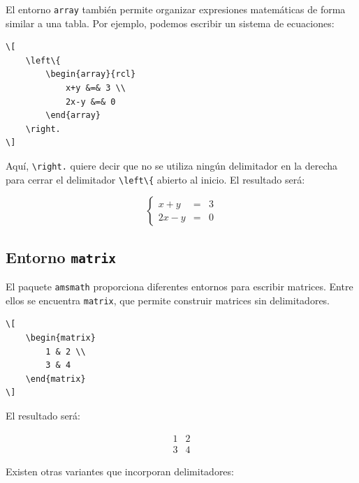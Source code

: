 \documentclass[11pt,a4paper]{article}
\theoremstyle{plain}
\theoremstyle{definition}
\theoremstyle{remark}
\theoremstyle{exercise}
\begin{document}
\noindent El entorno \verb|array| también permite organizar expresiones matemáticas de forma similar a una tabla. Por ejemplo, podemos escribir un sistema de ecuaciones:

\begin{lstlisting}
\[
    \left\{
        \begin{array}{rcl}
            x+y &=& 3 \\
            2x-y &=& 0
        \end{array}
    \right.
\]
\end{lstlisting}

\noindent Aquí, \verb|\right.| quiere decir que no se utiliza ningún delimitador en la derecha para cerrar el delimitador \verb|\left\{| abierto al inicio. El resultado será:

\begin{paginarecuadrada}
\[
    \left\{
        \begin{array}{rcl}
            x+y &=& 3 \\
            2x-y &=& 0
        \end{array}
    \right.
\]
\end{paginarecuadrada}


\subsection{Entorno \texttt{matrix}}

El paquete \verb|amsmath| proporciona diferentes entornos para escribir matrices. Entre ellos se encuentra \verb|matrix|, que permite construir matrices sin delimitadores.

\begin{lstlisting}
\[
    \begin{matrix}
        1 & 2 \\
        3 & 4
    \end{matrix}
\]
\end{lstlisting}

\noindent El resultado será:

\begin{paginarecuadrada}
\[
    \begin{matrix}
        1 & 2 \\
        3 & 4
    \end{matrix}
\]
\end{paginarecuadrada}

\medskip

\noindent Existen otras variantes que incorporan delimitadores:
\end{document}
